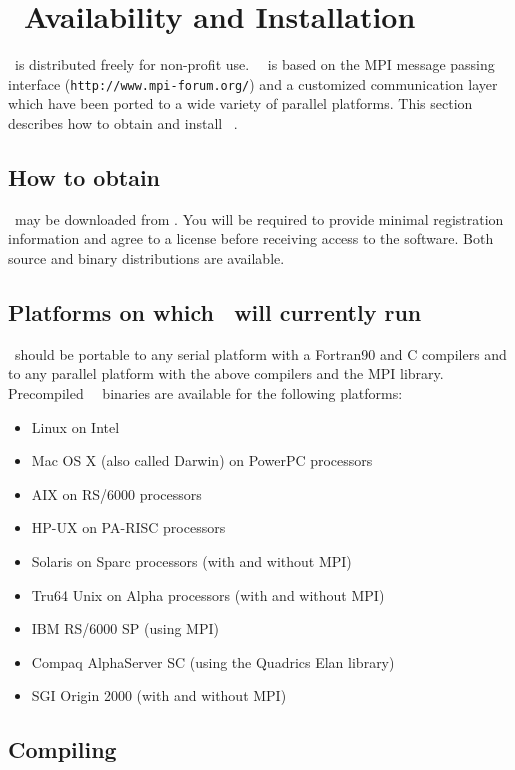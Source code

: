 \section{\PDAC\ Availability and Installation}
\label{section:avail}

\PDAC\ is distributed freely for non-profit use.
\PDAC\ \PDACVERSION\ is based on the MPI message passing interface
({\tt http://www.mpi-forum.org/})
and a customized communication layer which have been ported to a wide 
variety of parallel platforms.
This section describes how to obtain and install \PDAC\ \PDACVERSION.

\subsection{How to obtain \PDAC}

\PDAC\ may be downloaded from \PDACURL.
You will be required to provide minimal registration information and
agree to a license before receiving access to the software.
Both source and binary distributions are available.

\subsection{Platforms on which \PDAC\ will currently run}

\PDAC\ should be portable to any serial platform with a
Fortran90 and C compilers and to any parallel platform with
the above compilers and the MPI library.
Precompiled \PDAC\ \PDACVERSION\ binaries are available for the following platforms:  
\begin{itemize}
\item Linux on Intel
\item Mac OS X (also called Darwin) on PowerPC processors
\item AIX on RS/6000 processors 
\item HP-UX on PA-RISC processors 
\item Solaris on Sparc processors (with and without MPI)
\item Tru64 Unix on Alpha processors (with and without MPI)
\item IBM RS/6000 SP (using MPI)
\item Compaq AlphaServer SC (using the Quadrics Elan library)
\item SGI Origin 2000 (with and without MPI) 
\end{itemize}

\subsection{Compiling \PDAC}

